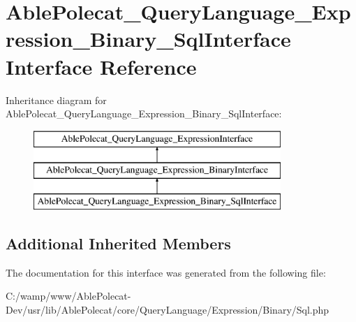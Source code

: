 \hypertarget{interface_able_polecat___query_language___expression___binary___sql_interface}{}\section{Able\+Polecat\+\_\+\+Query\+Language\+\_\+\+Expression\+\_\+\+Binary\+\_\+\+Sql\+Interface Interface Reference}
\label{interface_able_polecat___query_language___expression___binary___sql_interface}
Inheritance diagram for Able\+Polecat\+\_\+\+Query\+Language\+\_\+\+Expression\+\_\+\+Binary\+\_\+\+Sql\+Interface\+:\begin{figure}[H]
\begin{center}
\leavevmode
\includegraphics[height=3.000000cm]{interface_able_polecat___query_language___expression___binary___sql_interface}
\end{center}
\end{figure}
\subsection*{Additional Inherited Members}


The documentation for this interface was generated from the following file\+:\begin{DoxyCompactItemize}
\item 
C\+:/wamp/www/\+Able\+Polecat-\/\+Dev/usr/lib/\+Able\+Polecat/core/\+Query\+Language/\+Expression/\+Binary/Sql.\+php\end{DoxyCompactItemize}
